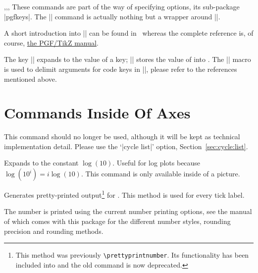 \begin{commandlist}{\pgfkeys,\pgfeov,\pgfkeysvalueof,\pgfkeysgetvalue}
    These commands are part of the \Tikz{} way of specifying options, its
    sub-package |pgfkeys|. The |\pgfplotsset| command is actually nothing but a
    wrapper around |\pgfkeys|.

    A short introduction into |\pgfkeys| can be found in~\cite{keyvalintro}
    whereas the complete reference is, of course, \href{https://tikz.dev/}{the PGF/TikZ manual}.

    The key |\pgfkeysvalueof| expands to the value of a key;
    |\pgfkeysgetvalue| stores the
    value of  into . The |\pgfeov|
    macro is used to delimit arguments for code keys in |\pgfkeys|, please
    refer to the references mentioned above.
\end{commandlist}


\section[commands-inside-axes]
        {Commands Inside Of {\normalfont\PGFPlots{}} Axes}

\begin{command}{\autoplotspeclist}
    This command should no longer be used, although it will be kept as
    technical implementation detail. Please use the `|cycle list|' option,
    Section~\ref{sec:cycle:list}.
\end{command}

\begin{command}{\logten}
    Expands to the constant $\log(10)$. Useful for log plots because $\log(10^i)
    = i\log(10)$. This command is only available inside of a \Tikz{} picture.
\end{command}

\begin{command}{\pgfmathprintnumber{}}
    Generates pretty-printed output\footnote{This method was previously
    \texttt{\textbackslash prettyprintnumber}. Its functionality has been
    included into \PGF{} and the old command is now deprecated.} for
    . This method is used for every tick label.

    The number is printed using the current number printing options, see the
    manual of \PGFPlotstable{} which comes with this package for the different
    number styles, rounding precision and rounding methods.
\end{command}

